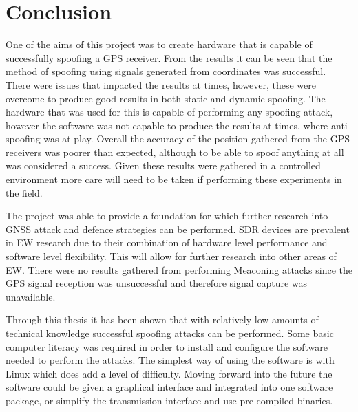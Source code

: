 
\chapter{Conclusion} %

\label{Chapter6} %


One of the aims of this project was to create hardware that is capable of successfully spoofing a GPS receiver. From the results it can be seen that the method of
spoofing using signals generated from coordinates was successful. There were issues that impacted the results at times, however, these were overcome to produce good
results in both static and dynamic spoofing. The hardware that was used for this is capable of performing any spoofing attack, however the
software was not capable to produce the results at times, where anti-spoofing was at play.
Overall the accuracy of the position gathered from the GPS receivers was poorer than expected, although
to be able to spoof anything at all was considered a success. Given these results were gathered in a controlled environment more care will need to be taken if
performing these experiments in the field. 

\bigskip

The project was able to provide a foundation for which further research into GNSS attack and defence strategies can be
performed. SDR devices are prevalent in EW research due to their combination of hardware level performance and software level flexibility. This will allow for further
research into other areas of EW.
There were no results gathered from performing Meaconing attacks since the GPS signal reception was unsuccessful and therefore signal capture was unavailable.

\bigskip

Through this thesis it has been shown that with relatively low amounts of technical knowledge successful spoofing attacks can be performed. Some basic computer literacy
was required in order to install and configure the software needed to perform the attacks. The simplest way of using the software is with Linux which does add a level of
difficulty.
Moving forward into the future the software could be given a graphical interface and integrated into one software package, or simplify the transmission interface and use
pre compiled binaries.

